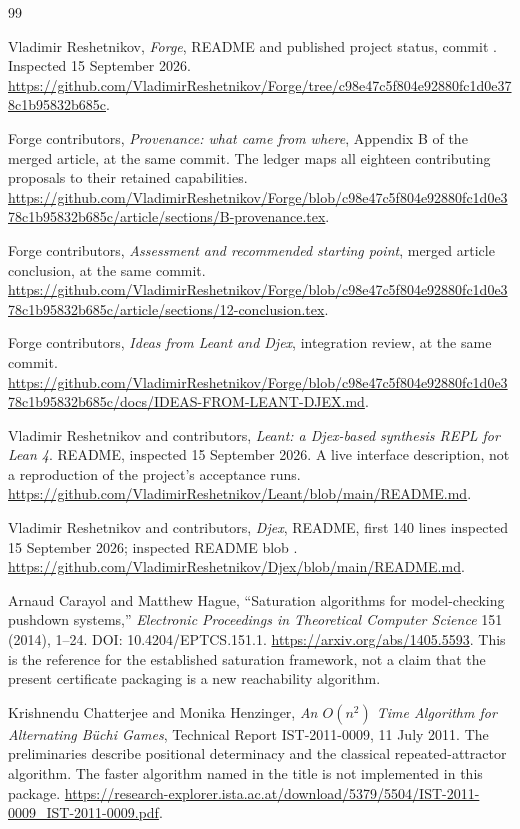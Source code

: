 \clearpage
\begin{thebibliography}{99}
\raggedright
{}

Vladimir Reshetnikov, \emph{Forge}, README and published project status,
commit .
Inspected 15 September 2026.
\url{https://github.com/VladimirReshetnikov/Forge/tree/c98e47c5f804e92880fc1d0e378c1b95832b685c}.

Forge contributors, \emph{Provenance: what came from where}, Appendix B of
the merged article, at the same commit. The ledger maps all eighteen
contributing proposals to their retained capabilities.
\url{https://github.com/VladimirReshetnikov/Forge/blob/c98e47c5f804e92880fc1d0e378c1b95832b685c/article/sections/B-provenance.tex}.

Forge contributors, \emph{Assessment and recommended starting point}, merged
article conclusion, at the same commit.
\url{https://github.com/VladimirReshetnikov/Forge/blob/c98e47c5f804e92880fc1d0e378c1b95832b685c/article/sections/12-conclusion.tex}.

Forge contributors, \emph{Ideas from Leant and Djex}, integration review,
at the same commit.
\url{https://github.com/VladimirReshetnikov/Forge/blob/c98e47c5f804e92880fc1d0e378c1b95832b685c/docs/IDEAS-FROM-LEANT-DJEX.md}.

Vladimir Reshetnikov and contributors, \emph{Leant: a Djex-based synthesis REPL
for Lean 4}. README, inspected 15 September 2026. A live interface description,
not a reproduction of the project's acceptance runs.
\url{https://github.com/VladimirReshetnikov/Leant/blob/main/README.md}.

Vladimir Reshetnikov and contributors, \emph{Djex}, README, first 140 lines
inspected 15 September 2026; inspected README blob
.
\url{https://github.com/VladimirReshetnikov/Djex/blob/main/README.md}.

Arnaud Carayol and Matthew Hague, ``Saturation algorithms for model-checking
pushdown systems,'' \emph{Electronic Proceedings in Theoretical Computer
Science} 151 (2014), 1--24. DOI: 10.4204/EPTCS.151.1.
\url{https://arxiv.org/abs/1405.5593}.
This is the reference for the established saturation framework, not a claim
that the present certificate packaging is a new reachability algorithm.

Krishnendu Chatterjee and Monika Henzinger, \emph{An $O(n^2)$ Time Algorithm
for Alternating B\"uchi Games}, Technical Report IST-2011-0009,
11 July 2011. The preliminaries describe positional determinacy and the
classical repeated-attractor algorithm. The faster algorithm named in the
title is not implemented in this package.
\url{https://research-explorer.ista.ac.at/download/5379/5504/IST-2011-0009_IST-2011-0009.pdf}.


\end{thebibliography}
